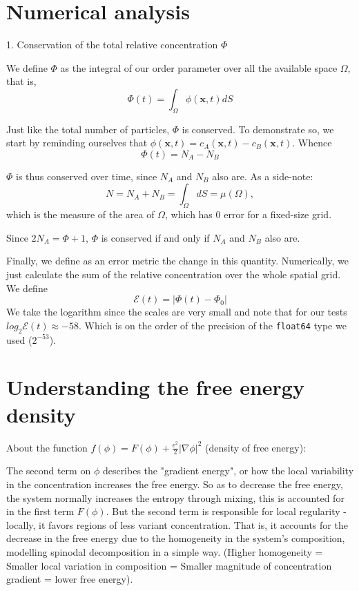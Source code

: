 \documentclass[a4paper]{article}
\begin{document}
\section{Numerical analysis}

1. Conservation of the total relative concentration $\Phi$

We define $\Phi$ as the integral of our order parameter over all the available space $\Omega$, that is,
$$
\Phi(t) = \int_{\Omega} \phi(\mathbf{x},t)dS
$$

Just like the total number of particles, $\Phi$ is conserved.
To demonstrate so, we start by reminding ourselves that $\phi(\mathbf{x},t) = c_A(\mathbf{x},t)-c_B(\mathbf{x},t)$.
Whence
$$
\Phi(t) = N_A - N_B
$$

$\Phi$ is thus conserved over time, since $N_A$ and $N_B$ also are.
As a side-note:
$$
N = N_A + N_B = \int_{\Omega} dS = \mu(\Omega),
$$
which is the measure of the area of $\Omega$, which has 0 error for a fixed-size grid.

Since $2N_A = \Phi+1$, $\Phi$ is conserved if and only if $N_A$ and $N_B$ also are.

Finally, we define as an error metric the change in this quantity.
Numerically, we just calculate the sum of the relative concentration over the whole spatial grid.
We define
\[ \mathcal{E}(t) = |\Phi(t) - \Phi_0| \]
We take the logarithm since the scales are very small and note that for our tests $log_{2}\mathcal{E}(t) \approx -58$.
Which is on the order of the precision of the \verb`float64` type we used ($2^{-53}$).



\section{Understanding the free energy density}
About the function $f(\phi) = F(\phi) + \frac{\epsilon^2}{2}|\nabla{\phi}|^2$ (density of free energy):

The second term on $\phi$ describes the "gradient energy", or how the local variability in the concentration increases the free energy.
So as to decrease the free energy, the system normally increases the entropy through mixing, this is accounted for in the first term $F(\phi)$.
But the second term is responsible for local regularity - locally, it favors regions of less variant concentration.
That is, it accounts for the decrease in the free energy due to the homogeneity in the system's composition, modelling spinodal decomposition in a simple way.
(Higher homogeneity = Smaller local variation in composition = Smaller magnitude of concentration gradient = lower free energy).
\end{document}
